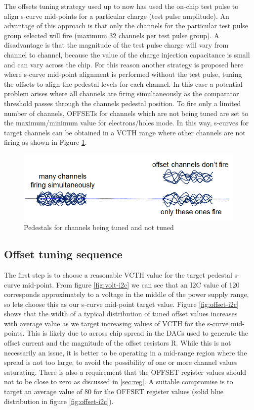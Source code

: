 \documentclass[11pt,a4paper]{article}
\begin{document}
	The offsets tuning strategy used up to now has used the on-chip test pulse to align s-curve mid-points for a particular charge (test pulse amplitude). 
	An advantage of this approach is that only the channels for the particular test pulse group selected will fire (maximum 32 channels per test pulse group). A disadvantage is that the magnitude of the test pulse charge will vary from channel to channel, because the value of the charge injection capacitance is small and can vary across the chip. 
	For this reason another strategy is proposed here where s-curve mid-point alignment is performed without the test pulse, tuning the offsets to align the pedestal levels for each channel. In this case a potential problem arises where all channels are firing simultaneously as the comparator threshold passes through the channels pedestal position.  
To fire only a limited number of channels, OFFSETs for channels which are not being tuned are set to the maximum/minimum value for electrons/holes
	mode.  In this way, s-curves for target channels can be obtained in a VCTH range where other channels are not firing as shown in Figure \ref{fig:pedestals}.

	\begin{figure}[htbp]
	\centering
	\includegraphics[width=\textwidth]{fig/pedestals.png}
	\caption{Pedestals for channels being tuned and not tuned }\label{fig:pedestals}
	\end{figure}

	\subsection{Offset tuning sequence}\label{subsec:calib-sequence}

	The first step is to choose a reasonable VCTH value for the target pedestal s-curve mid-point.  From figure \ref{fig:volt-i2c} we can see that an I2C value of 120 corresponds approximately to a voltage in the middle of the power supply range, so lets choose this as our s-curve mid-point target value.
	Figure  \ref{fig:offset-i2c} shows that the width of a typical distribution of tuned offset values increases with average value as we target increasing values of VCTH for the s-curve mid-points. This is likely due to across chip spread in the DACs used to generate the offset current and the magnitude of the offset resistors R. While this is not necessarily an issue, it is better to be operating in a mid-range region where the spread is not too large, to avoid the possibility of one or more channel values saturating. There is also a requirement that the OFFSET register values should not to be close to zero as discussed in \ref{sec:reg}.  A suitable compromise is to target an average value of 80 for the OFFSET register values (solid blue distribution in figure \ref{fig:offset-i2c}).
\end{document}
